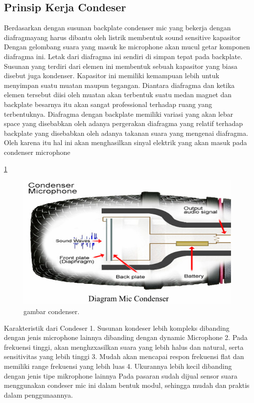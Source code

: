 \documentclass{article}
\begin{document}
\subsection {Prinsip Kerja Condeser}
Berdasarkan dengan susunan backplate condenser mic yang bekerja dengan diafragmayang harus dibantu oleh listrik membentuk sound sensitive kapasitor  Dengan gelombang suara yang masuk ke microphone akan mucul getar komponen diafragma ini. Letak dari diafragma ini sendiri di simpan tepat pada backplate. Susunan yang terdiri dari elemen ini membentuk sebuah kapasitor yang biasa disebut juga kondenser. Kapasitor ini memiliki kemampuan lebih untuk menyimpan suatu muatan maupun tegangan. Diantara diafragma dan ketika elemen tersebut diisi oleh muatan akan terbentuk suatu medan magnet dan backplate besarnya itu akan sangat professional terhadap ruang yang terbentuknya. Diafragma dengan backplate memiliki variasi yang akan lebar space yang disebabkan oleh adanya pergerakan diafragma yang relatif terhadap backplate yang disebabkan oleh adanya takanan suara yang mengenai diafragma. Oleh karena itu hal ini akan menghasilkan sinyal elektrik yang akan masuk pada condenser microphone

\ref{condenser.JPG}

\begin{figure}[ht]
\centerline{\includegraphics[width=1\textwidth]{figures/condenser.JPG}}
\caption{gambar condenser.}
\label{condenser.JPG}
\end{figure}

Karakteristik dari Condeser
1. Susunan kondeser lebih kompleks dibanding dengan jenis microphone lainnya dibanding dengan dynamic Microphone
2. Pada frekuensi tinggi, akan menghzxasilkan suara yang lebih halus dan natural, serta sensitivitas yang lebih tinggi
3. Mudah akan mencapai respon frekuensi flat dan memiliki range frekuensi yang lebih luas
4. Ukurannya lebih kecil dibanding dengan jenis tipe mikrophone lainnya
Pada pasaran sudah dijual sensor suara menggunakan condeser mic ini dalam bentuk modul, sehingga mudah dan praktis dalam penggunaannya.
\end{document}
